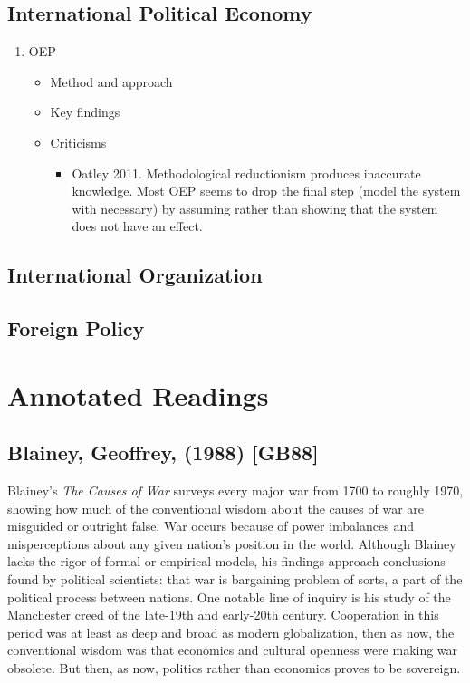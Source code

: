 \documentclass[11pt]{article}
\begin{document}
\subsection{International Political Economy}
\label{sec-1-3}
\begin{enumerate}
\item OEP
\label{sec-1-3-1}
\begin{itemize}
\item Method and approach
\label{sec-1-3-1-1}
\item Key findings
\label{sec-1-3-1-2}
\item Criticisms
\label{sec-1-3-1-3}
\begin{itemize}
\item Oatley 2011.
\label{sec-1-3-1-3-1}
Methodological reductionism produces inaccurate knowledge. Most OEP
seems to drop the final step (model the system with necessary) by
assuming rather than showing that the system does not have an effect.
\end{itemize}
\end{itemize}
\end{enumerate}
\subsection{International Organization}
\label{sec-1-4}

\subsection{Foreign Policy}
\label{sec-1-5}

\section{Annotated Readings}
\label{sec-2}
\subsection{Blainey, Geoffrey, (1988) [GB88]}
\label{sec-2-1}
Blainey's \emph{The Causes of War} surveys every major war from 1700 to
roughly 1970, showing how much of the conventional wisdom about the
causes of war are misguided or outright false. War occurs because of
power imbalances and misperceptions about any given nation's position
in the world. Although Blainey lacks the rigor of formal or empirical
models, his findings approach conclusions found by political
scientists: that war is bargaining problem of sorts, a part of the
political process between nations. One notable line of inquiry is his
study of the Manchester creed of the late-19th and early-20th
century. Cooperation in this period was at least as deep and broad as
modern globalization, then as now, the conventional wisdom was that
economics and cultural openness were making war obsolete. But then, as
now, politics rather than economics proves to be sovereign.  
\end{document}
